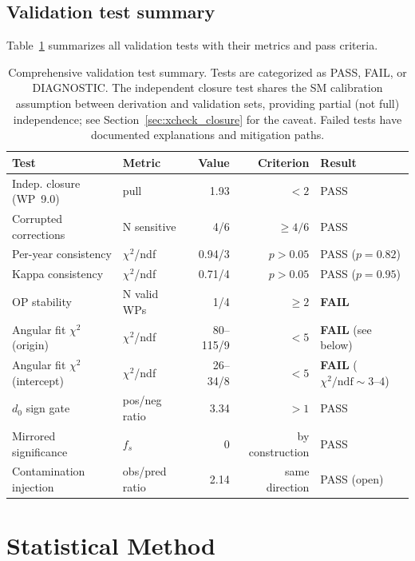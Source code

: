 \documentclass[11pt,a4paper]{article}
\begin{document}
\subsection{Validation test summary}
\label{sec:validation_summary}

Table~\ref{tab:validation_summary} summarizes all validation tests with their metrics
and pass criteria.

\begin{table}[htbp]
\centering
\caption{Comprehensive validation test summary. Tests are categorized as PASS, FAIL,
or DIAGNOSTIC. The independent closure test shares the SM calibration assumption
between derivation and validation sets, providing partial (not full) independence;
see Section~\ref{sec:xcheck_closure} for the caveat.
Failed tests have documented explanations and mitigation paths.}
\label{tab:validation_summary}
\small
\begin{tabular}{llrrl}
\toprule
Test & Metric & Value & Criterion & Result \\
\midrule
Indep. closure (WP~9.0) & pull & 1.93 & $< 2$ & PASS \\
Corrupted corrections & N sensitive & 4/6 & $\geq 4/6$ & PASS \\
Per-year consistency & $\chi^2$/ndf & 0.94/3 & $p > 0.05$ & PASS ($p = 0.82$) \\
Kappa consistency & $\chi^2$/ndf & 0.71/4 & $p > 0.05$ & PASS ($p = 0.95$) \\
OP stability & N valid WPs & 1/4 & $\geq 2$ & \textbf{FAIL} \\
Angular fit $\chi^2$ (origin) & $\chi^2$/ndf & 80--115/9 & $< 5$ & \textbf{FAIL} (see below) \\
Angular fit $\chi^2$ (intercept) & $\chi^2$/ndf & 26--34/8 & $< 5$ & \textbf{FAIL} ($\chi^2/\mathrm{ndf} \sim 3$--$4$) \\
$d_0$ sign gate & pos/neg ratio & 3.34 & $> 1$ & PASS \\
Mirrored significance & $f_s$ & 0 & by construction & PASS \\
Contamination injection & obs/pred ratio & 2.14 & same direction & PASS (open) \\
\bottomrule
\end{tabular}
\end{table}

\FloatBarrier
{}
\section{Statistical Method}
\label{sec:statmethod}
\end{document}
